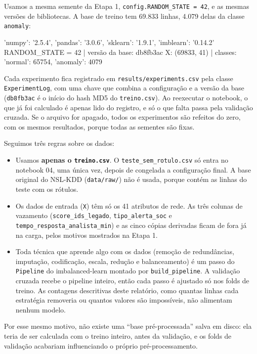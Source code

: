 \documentclass[11pt,a4paper]{article}
\begin{document}
Usamos a mesma semente da Etapa 1, \texttt{config.RANDOM\_STATE = 42}, e as mesmas versões de bibliotecas. A base de treino tem 69.833 linhas, 4.079 delas da classe \texttt{anomaly}:

\begin{saida}
{'numpy': '2.5.4', 'pandas': '3.0.6', 'sklearn': '1.9.1', 'imblearn': '0.14.2'}
RANDOM_STATE = 42 | versão da base: db8fb3ac
X: (69833, 41) | classes: {'normal': 65754, 'anomaly': 4079}
\end{saida}

Cada experimento fica registrado em \texttt{results/experiments.csv} pela classe \texttt{ExperimentLog}, com uma chave que combina a configuração e a versão da base (\texttt{db8fb3ac} é o início do hash MD5 do \texttt{treino.csv}). Ao reexecutar o notebook, o que já foi calculado é apenas lido do registro, e só o que falta passa pela validação cruzada. Se o arquivo for apagado, todos os experimentos são refeitos do zero, com os mesmos resultados, porque todas as sementes são fixas.

Seguimos três regras sobre os dados:
\begin{itemize}
\item Usamos \textbf{apenas o \texttt{treino.csv}}. O \texttt{teste\_sem\_rotulo.csv} só entra no notebook 04, uma única vez, depois de congelada a configuração final. A base original do NSL-KDD (\texttt{data/raw/}) não é usada, porque contém as linhas do teste com os rótulos.
\item Os dados de entrada (\texttt{X}) têm só os 41 atributos de rede. As três colunas de vazamento (\texttt{score\_ids\_legado}, \texttt{tipo\_alerta\_soc} e \texttt{tempo\_resposta\_analista\_min}) e as cinco cópias derivadas ficam de fora já na carga, pelos motivos mostrados na Etapa 1.
\item Toda técnica que aprende algo com os dados (remoção de redundâncias, imputação, codificação, escala, redução e balanceamento) é um passo do \texttt{Pipeline} do imbalanced-learn montado por \texttt{build\_pipeline}. A validação cruzada recebe o pipeline inteiro, então cada passo é ajustado só nos folds de treino. As contagens descritivas deste relatório, como quantas linhas cada estratégia removeria ou quantos valores são impossíveis, não alimentam nenhum modelo.
\end{itemize}

Por esse mesmo motivo, não existe uma ``base pré-processada'' salva em disco: ela teria de ser calculada com o treino inteiro, antes da validação, e os folds de validação acabariam influenciando o próprio pré-processamento.
\end{document}
